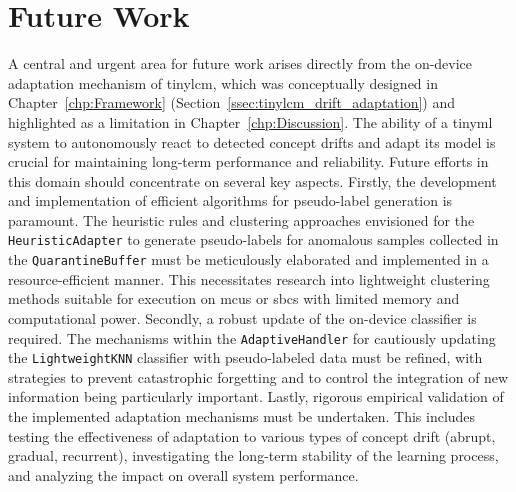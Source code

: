 
\chapter{Future Work}
\label{chp:Future_Work}

A central and urgent area for future work arises directly from the on-device adaptation mechanism of \gls{tinylcm}, which was conceptually designed in Chapter~\ref{chp:Framework} (Section~\ref{ssec:tinylcm_drift_adaptation}) and highlighted as a limitation in Chapter~\ref{chp:Discussion}. The ability of a \gls{tinyml} system to autonomously react to detected concept drifts and adapt its model is crucial for maintaining long-term performance and reliability. Future efforts in this domain should concentrate on several key aspects. Firstly, the development and implementation of efficient algorithms for pseudo-label generation is paramount. The heuristic rules and clustering approaches envisioned for the \texttt{HeuristicAdapter} to generate pseudo-labels for anomalous samples collected in the \texttt{QuarantineBuffer} must be meticulously elaborated and implemented in a resource-efficient manner. This necessitates research into lightweight clustering methods suitable for execution on \glspl{mcu} or \glspl{sbc} with limited memory and computational power. Secondly, a robust update of the on-device classifier is required. The mechanisms within the \texttt{AdaptiveHandler} for cautiously updating the \texttt{LightweightKNN} classifier with pseudo-labeled data must be refined, with strategies to prevent catastrophic forgetting and to control the integration of new information being particularly important. Lastly, rigorous empirical validation of the implemented adaptation mechanisms must be undertaken. This includes testing the effectiveness of adaptation to various types of concept drift (abrupt, gradual, recurrent), investigating the long-term stability of the learning process, and analyzing the impact on overall system performance.

